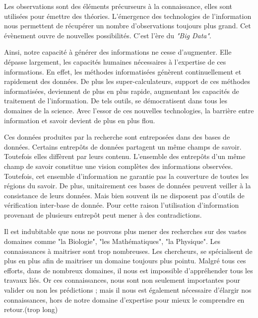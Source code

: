 Les observations sont des éléments précurseurs à la connaissance, elles sont utilisées pour émettre des théories. L'émergence des technologies de l'information nous permettent de récupérer un nombre d'observations toujours plus grand. Cet évènement ouvre de nouvelles possibilités. C'est l'ère du \textit{"Big Data"}.

Ainsi, notre capacité à générer des informations ne cesse d'augmenter. Elle dépasse largement, les capacités humaines nécessaires à l'expertise de ces informations. En effet, les méthodes informatisées génèrent continuellement et rapidement des données. De plus les super-calculateurs, support de ces méthodes informatisées, deviennent de plus en plus rapide, augmentant les capacités de traitement de l'information. De tels outils, se démocratisent dans tous les domaines de la science. Avec l'essor de ces nouvelles technologies, la barrière entre information et savoir devient de plus en plus flou.


Ces données produites par la recherche sont entreposées dans des bases de données. Certains entrepôts de données partagent un même champs de savoir. Toutefois elles diffèrent par leurs contenu. L'ensemble des entrepôts d'un même champ de savoir constitue une vision complètes des informations observées. Toutefois, cet ensemble d'information ne garantie pas la couverture de toutes les régions du savoir. De plus, unitairement ces bases de données peuvent veiller à la consistance de leurs données. Mais bien souvent ils ne disposent pas d'outils de vérification inter-base de donnée. Pour cette raison l'utilisation d'information provenant de plusieurs entrepôt peut mener à des contradictions. 

Il est indubitable que nous ne pouvons plus mener des recherches sur des vastes domaines comme "la Biologie", "les Mathématiques", "la Physique". Les connaissances à maitriser sont trop nombreuses. Les chercheurs, se spécialisent de plus en plus afin de maitriser un domaine toujours plus pointu. Malgré tous ces efforts, dans de nombreux domaines, il nous est impossible d'appréhender tous les travaux liés. Or ces connaissances, nous sont non seulement
importantes pour valider ou non les prédictions ; mais il nous est également nécessaire d'élargir nos connaissances, hors de notre domaine d'expertise pour mieux le comprendre en retour.(trop long)

